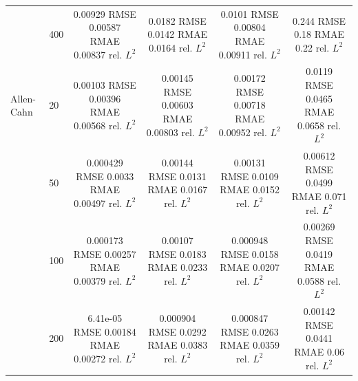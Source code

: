 \begin{tabular}{llcccc}
 & 400 & \shortstack{0.00929 RMSE\\0.00587 RMAE\\0.00837 rel. $L^2$} & \shortstack{0.0182 RMSE\\0.0142 RMAE\\0.0164 rel. $L^2$} & \shortstack{0.0101 RMSE\\0.00804 RMAE\\0.00911 rel. $L^2$} & \shortstack{0.244 RMSE\\0.18 RMAE\\0.22 rel. $L^2$} \\
\addlinespace
Allen-Cahn & 20 & \shortstack{0.00103 RMSE\\0.00396 RMAE\\0.00568 rel. $L^2$} & \shortstack{0.00145 RMSE\\0.00603 RMAE\\0.00803 rel. $L^2$} & \shortstack{0.00172 RMSE\\0.00718 RMAE\\0.00952 rel. $L^2$} & \shortstack{0.0119 RMSE\\0.0465 RMAE\\0.0658 rel. $L^2$} \\
 & 50 & \shortstack{0.000429 RMSE\\0.0033 RMAE\\0.00497 rel. $L^2$} & \shortstack{0.00144 RMSE\\0.0131 RMAE\\0.0167 rel. $L^2$} & \shortstack{0.00131 RMSE\\0.0109 RMAE\\0.0152 rel. $L^2$} & \shortstack{0.00612 RMSE\\0.0499 RMAE\\0.071 rel. $L^2$} \\
 & 100 & \shortstack{0.000173 RMSE\\0.00257 RMAE\\0.00379 rel. $L^2$} & \shortstack{0.00107 RMSE\\0.0183 RMAE\\0.0233 rel. $L^2$} & \shortstack{0.000948 RMSE\\0.0158 RMAE\\0.0207 rel. $L^2$} & \shortstack{0.00269 RMSE\\0.0419 RMAE\\0.0588 rel. $L^2$} \\
 & 200 & \shortstack{6.41e-05 RMSE\\0.00184 RMAE\\0.00272 rel. $L^2$} & \shortstack{0.000904 RMSE\\0.0292 RMAE\\0.0383 rel. $L^2$} & \shortstack{0.000847 RMSE\\0.0263 RMAE\\0.0359 rel. $L^2$} & \shortstack{0.00142 RMSE\\0.0441 RMAE\\0.06 rel. $L^2$} \\

\end{tabular}
